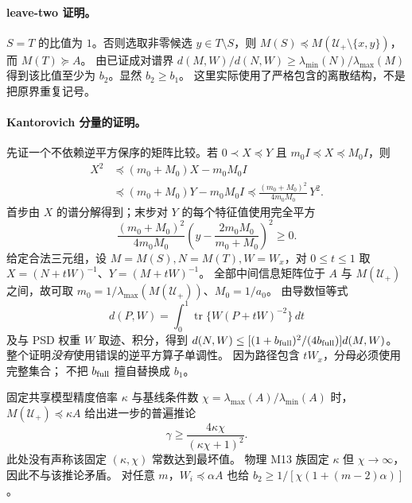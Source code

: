\paragraph{leave-two 证明。}
$S=T$ 的比值为 $1$。否则选取非零候选 $y\in T\setminus S$，则
$M(S)\preceq M(\mathcal U_+\setminus\{x,y\})$，而 $M(T)\succeq A$。
由已证成对谱界
$d(M,W)/d(N,W)\ge\lambda_{\min}(N)/\lambda_{\max}(M)$
得到该比值至少为 $b_2$。显然 $b_2\ge b_1$。
这里实际使用了严格包含的离散结构，不是把原界重复记号。

\paragraph{Kantorovich 分量的证明。}
先证一个不依赖逆平方保序的矩阵比较。若
$0\prec X\preceq Y$ 且 $m_0I\preceq X\preceq M_0I$，则
\begin{align}
 X^2&\preceq(m_0+M_0)X-m_0M_0I\\
 &\preceq(m_0+M_0)Y-m_0M_0I
 \preceq\frac{(m_0+M_0)^2}{4m_0M_0}\,Y^2.
\end{align}
首步由 $X$ 的谱分解得到；末步对 $Y$ 的每个特征值使用完全平方
\[
 \frac{(m_0+M_0)^2}{4m_0M_0}
 \left(y-\frac{2m_0M_0}{m_0+M_0}\right)^2\ge0.
\]
给定合法三元组，设 $M=M(S),N=M(T),W=W_x$，对 $0\le t\le1$ 取
$X=(N+tW)^{-1}$、$Y=(M+tW)^{-1}$。
全部中间信息矩阵位于 $A$ 与 $M(\mathcal U_+)$ 之间，故可取
$m_0=1/\lambda_{\max}(M(\mathcal U_+))$、$M_0=1/a_0$。
由导数恒等式
\[
 d(P,W)=\int_0^1\operatorname{tr}\{W(P+tW)^{-2}\}\,dt
\]
及与 PSD 权重 $W$ 取迹、积分，得到
$d(N,W)\le[(1+b_{\rm full})^2/(4b_{\rm full})]d(M,W)$。
整个证明\emph{没有}使用错误的逆平方算子单调性。
因为路径包含 $tW_x$，分母必须使用完整集合；
不把 $b_{\rm full}$ 擅自替换成 $b_1$。

固定共享模型精度倍率 $\kappa$ 与基线条件数
$\chi=\lambda_{\max}(A)/\lambda_{\min}(A)$ 时，
$M(\mathcal U_+)\preceq\kappa A$ 给出进一步的普遍推论
\[
 \gamma\ge\frac{4\kappa\chi}{(\kappa\chi+1)^2}.
\]
此处没有声称该固定 $(\kappa,\chi)$ 常数达到最坏值。
物理 M13 族固定 $\kappa$ 但 $\chi\to\infty$，因此不与该推论矛盾。
对任意 $m$，$W_i\preceq\alpha A$ 也给
$b_2\ge1/[\chi(1+(m-2)\alpha)]$。

